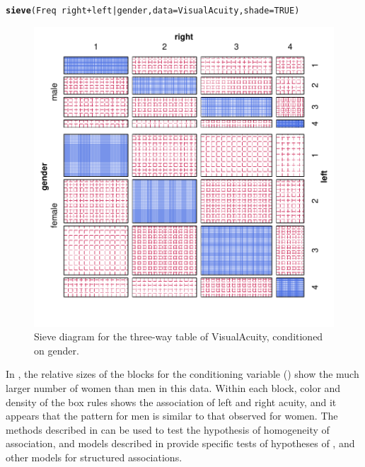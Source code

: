 \documentclass[11pt]{book}\usepackage[]{graphicx}\usepackage[]{color}
\makeatletter
\newcommand{\hlnum}[1]{\textcolor[rgb]{0.686,0.059,0.569}{#1}}%
\newcommand{\hlopt}[1]{\textcolor[rgb]{0,0,0}{#1}}%
\newcommand{\hlstd}[1]{\textcolor[rgb]{0.345,0.345,0.345}{#1}}%
\newcommand{\hlkwc}[1]{\textcolor[rgb]{0.333,0.667,0.333}{#1}}%
\newcommand{\hlkwd}[1]{\textcolor[rgb]{0.737,0.353,0.396}{\textbf{#1}}}%
\newenvironment{kframe}{%
 \def\at@end@of@kframe{}%
 \ifinner\ifhmode%
  \def\at@end@of@kframe{\end{minipage}}%
  \begin{minipage}{\columnwidth}%
 \fi\fi%
 \def\FrameCommand##1{\hskip\@totalleftmargin \hskip-\fboxsep
 \colorbox{shadecolor}{##1}\hskip-\fboxsep
     \hskip-\linewidth \hskip-\@totalleftmargin \hskip\columnwidth}%
 \MakeFramed {\advance\hsize-\width
   \@totalleftmargin\z@ \linewidth\hsize
   \@setminipage}}%
 {\par\unskip\endMakeFramed%
 \at@end@of@kframe}
\newenvironment{knitrout}{}{} %
\renewenvironment{knitrout}{\small\renewcommand{\baselinestretch}{.85}}{} %
\makeatother
\begin{document}
\begin{knitrout}
\color{fgcolor}\begin{kframe}
\begin{alltt}
\hlkwd{sieve}\hlstd{(Freq} \hlopt{~} \hlstd{right} \hlopt{+} \hlstd{left} \hlopt{|} \hlstd{gender,}  \hlkwc{data} \hlstd{= VisualAcuity,} \hlkwc{shade}\hlstd{=}\hlnum{TRUE}\hlstd{)}
\end{alltt}
\end{kframe}\begin{figure}[htbp]


\centerline{\includegraphics[width=.7\textwidth]{ch04/fig/VA-sieve3} }

\caption[Sieve diagram for the three-way table of VisualAcuity, conditioned on gender]{Sieve diagram for the three-way table of VisualAcuity, conditioned on gender.\label{fig:VA-sieve3}}
\end{figure}


\end{knitrout}


In , the relative sizes of the blocks for the conditioning
variable () show the much larger number of women than men in
this data.  Within each block, color and density of the box rules shows the 
association of left and right acuity, and it appears that the pattern
for men is similar to that observed for women.  
The methods described in  can be used to test
the hypothesis of homogeneity of association, and 
\loglin models described in  provide 
specific tests of hypotheses of ,
 and other models for structured associations.
\end{document}
